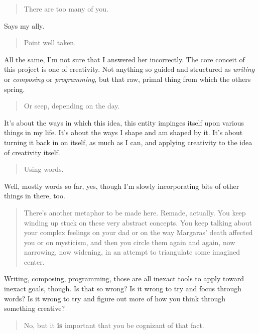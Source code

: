 \begin{quote}
There are too many of you.
\end{quote}

Says my ally.

\begin{quote}
Point well taken.
\end{quote}

All the same, I'm not sure that I answered her incorrectly. The core conceit of this project is one of creativity. Not anything so guided and structured as \emph{writing} or \emph{composing} or \emph{programming}, but that raw, primal thing from which the others spring.

\begin{quote}
Or seep, depending on the day.
\end{quote}

It's about the ways in which this idea, this entity impinges itself upon various things in my life. It's about the ways I shape and am shaped by it. It's about turning it back in on itself, as much as I can, and applying creativity to the idea of creativity itself.

\begin{quote}
Using words.
\end{quote}

Well, mostly words so far, yes, though I'm slowly incorporating bits of other things in there, too.

\begin{quote}
There's another metaphor to be made here. Remade, actually. You keep winding up stuck on these very abstract concepts. You keep talking about your complex feelings on your dad or on the way Margaras' death affected you or on mysticism, and then you circle them again and again, now narrowing, now widening, in an attempt to triangulate some imagined center.
\end{quote}

Writing, composing, programming, those are all inexact tools to apply toward inexact goals, though. Is that so wrong? Is it wrong to try and focus through words? Is it wrong to try and figure out more of how you think through something creative?

\begin{quote}
No, but it \textbf{is} important that you be cognizant of that fact.
\end{quote}
